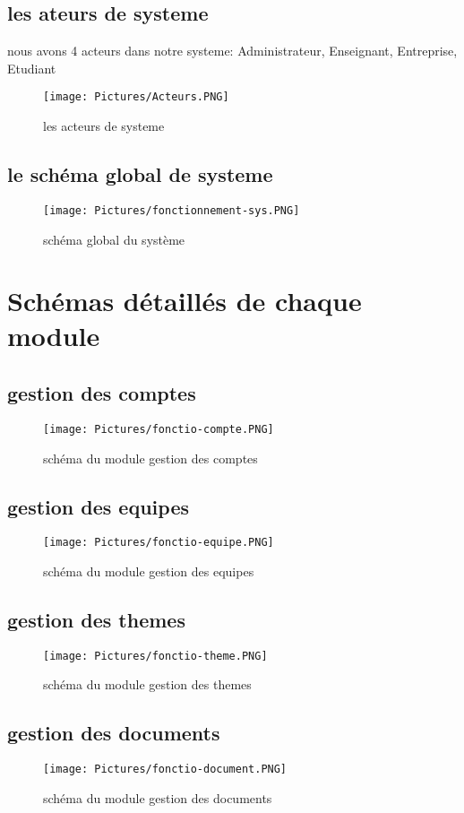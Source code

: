 \documentclass[11pt,fleqn]{book} %
\begin{document}
\subsection{les ateurs de systeme}
nous avons 4 acteurs dans notre systeme: Administrateur, Enseignant, Entreprise, Etudiant
\begin{figure}[h]
    \centering
    \texttt{[image: Pictures/Acteurs.PNG]}
    \caption{les acteurs de systeme}
    \label{fig:pca}
\end{figure}
\newpage
\subsection{le schéma global de systeme}
\begin{figure}[h]
    \centering
    \texttt{[image: Pictures/fonctionnement-sys.PNG]}
    \caption{schéma global du système}
    \label{fig:pca}
\end{figure}
\newpage
\section{Schémas détaillés de chaque module}
\subsection{gestion des comptes}
\begin{figure}[h]
    \centering
    \texttt{[image: Pictures/fonctio-compte.PNG]}
        \caption{schéma du module gestion des comptes}
\end{figure}
\newpage
\subsection{gestion des equipes}
\begin{figure}[h]
    \centering
    \texttt{[image: Pictures/fonctio-equipe.PNG]}
        \caption{schéma du module gestion des equipes}
\end{figure}
\newpage
\subsection{gestion des themes}
\begin{figure}[h]
    \centering
    \texttt{[image: Pictures/fonctio-theme.PNG]}
        \caption{schéma du module gestion des themes}
\end{figure}
\newpage
\subsection{gestion des documents}
\begin{figure}[h]
    \centering
    \texttt{[image: Pictures/fonctio-document.PNG]}
        \caption{schéma du module gestion des documents}
\end{figure}
\newpage
\end{document}
